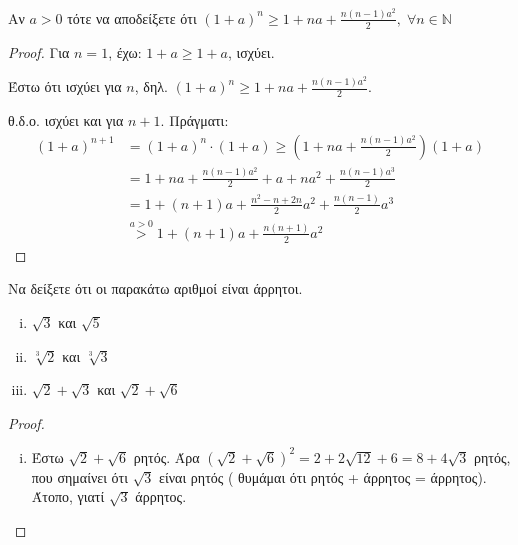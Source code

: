 \begin{multicols}{2}
\begin{enumerate}
    \item \textcolor{Col1}{Αν $a > 0$ τότε να αποδείξετε ότι $ (1+a)^{n} 
            \geq 1 + na + \frac{n(n-1)a^{2}}{2},\; \forall n \in \mathbb{N}$}

        \begin{proof}
        \item {}
            Για $ n=1 $, έχω: $ 1+a \geq 1+a $, ισχύει.

            Έστω ότι ισχύει για $n$, δηλ. $ (1+a)^{n} \geq 1+na +
            \frac{n(n-1)a^{2}}{2} $.

            θ.δ.ο. ισχύει και για $ n+1 $. Πράγματι:
\begin{align*}
    (1+a)^{n+1} &= (1+a)^{n}\cdot (1+a) \geq (1+na+ 
    \frac{n(n-1)a^{2}}{2})(1+a) \\
                &= 1+na+ \frac{n(n-1)a^{2}}{2} + a + na^{2} + 
                \frac{n(n-1)a^{3}}{2} \\
                &= 1+(n+1)a+ \frac{n^{2}-n+2n}{2} a^{2} + 
                \frac{n(n-1)}{2} a^{3} \\
                &\overset{a>0}{>} 1+(n+1)a + \frac{n(n+1)}{2} a^{2}
\end{align*}
        \end{proof}


    \item \textcolor{Col1}{Να δείξετε ότι οι παρακάτω αριθμοί είναι άρρητοι.
        \begin{enumerate}[i)]
            \item $ \sqrt{3} $ και  $ \sqrt{5} $
            \item $ \sqrt[3]{2} $ και $ \sqrt[3]{3} $
            \item $ \sqrt{2} + \sqrt{3} $ και $ \sqrt{2} + \sqrt{6} $ 
    \end{enumerate}}
    \end{enumerate}

    \begin{proof}
    \item {}
        \begin{enumerate}[i)]
            \item Έστω $ \sqrt{2} + \sqrt{6} $ ρητός. Άρα $ (\sqrt{2} +
                \sqrt{6} )^{2} = 2 + 2 \sqrt{12} + 6 = 8 + 4 \sqrt{3} $ 
                ρητός, που σημαίνει ότι $ \sqrt{3} $ είναι ρητός (
                θυμάμαι ότι ρητός + άρρητος = άρρητος). Άτοπο, 
                γιατί $ \sqrt{3} $ άρρητος.
        \end{enumerate}
    \end{proof}

\end{multicols}


